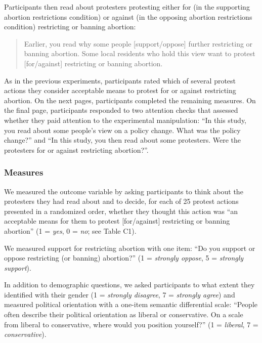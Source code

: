 \documentclass[12pt, letterpaper]{article}
\begin{document}
Participants then read about protesters protesting either for (in the
supporting abortion restrictions condition) or against (in the opposing
abortion restrictions condition) restricting or banning abortion:

\begin{quote}
Earlier, you read why some people {[}support/oppose{]} further
restricting or banning abortion. Some local residents who hold this view
want to protest {[}for/against{]} restricting or banning abortion.
\end{quote}

\noindent As in the previous experiments, participants rated which of
several protest actions they consider acceptable means to protest for or
against restricting abortion. On the next pages, participants completed
the remaining measures. On the final page, participants responded to two
attention checks that assessed whether they paid attention to the
experimental manipulation: ``In this study, you read about some people's
view on a policy change. What was the policy change?'' and ``In this
study, you then read about some protesters. Were the protesters for or
against restricting abortion?''.

\hypertarget{measures-2}{%
\subsubsection{Measures}\label{measures-2}}

We measured the outcome variable by asking participants to think about
the protesters they had read about and to decide, for each of 25 protest
actions presented in a randomized order, whether they thought this
action was ``an acceptable means for them to protest {[}for/against{]}
restricting or banning abortion'' (1 = \emph{yes}, 0 = \emph{no}; see
Table C1).

We measured support for restricting abortion with one item: ``Do you
support or oppose restricting (or banning) abortion?'' (1 =
\emph{strongly oppose}, 5 = \emph{strongly support}).

In addition to demographic questions, we asked participants to what
extent they identified with their gender (1 = \emph{strongly disagree},
7 = \emph{strongly agree}) and measured political orientation with a
one-item semantic differential scale: ``People often describe their
political orientation as liberal or conservative. On a scale from
liberal to conservative, where would you position yourself?'' (1 =
\emph{liberal}, 7 = \emph{conservative}).
\end{document}
